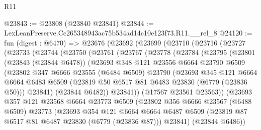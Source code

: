 \begin{lexlean}{R11}
\begin{coremodule}
@23843 := @23808 (@23840 @23841)
@23844 := LexLeanPreserve.Cc265348943ac75b534ad14c10e123f73.R11.__rel_8
@24120 := fun (digest : @6470) =>
  @23676
    (@23692
      (@23699
        (@23710
          (@23716
            (@23727
              (@23733
                (@23744
                  (@23750
                    (@23761
                      (@23767
                        (@23778
                          (@23784
                            (@23795
                              (@23801
                                (@23843 (@23844 @6478))
                                (@23693
                                  @348
                                  @121
                                  @23556
                                  @6664
                                  @23790
                                  @6509
                                  (@23802
                                    @347
                                    @6666
                                    @23555
                                    (@6484 @6509)
                                    @23790
                                    (@23693
                                      @345
                                      @121
                                      @6664
                                      @6664
                                      @6483
                                      @6509
                                      (@23819 @50 @6517 @81 @6483 @23830 (@6779 (@23836 @50)))
                                      @23841)
                                    (@23844 @6482))
                                  @23841))
                              (@17567 @23561 @23563))
                            (@23693
                              @357
                              @121
                              @23568
                              @6664
                              @23773
                              @6509
                              (@23802
                                @356
                                @6666
                                @23567
                                (@6488 @6509)
                                @23773
                                (@23693
                                  @354
                                  @121
                                  @6664
                                  @6664
                                  @6487
                                  @6509
                                  (@23819 @87 @6517 @81 @6487 @23830 (@6779 (@23836 @87)))
                                  @23841)
                                (@23844 @6486))

\end{coremodule}
\end{lexlean}
